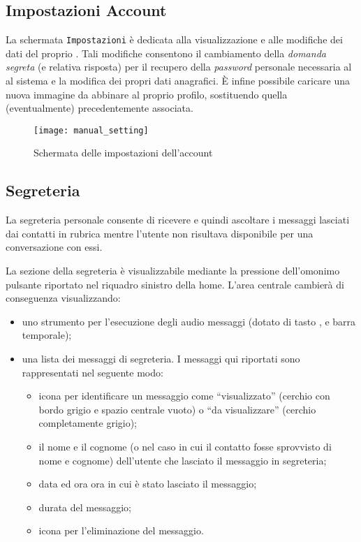\subsection{Impostazioni Account}
La schermata \texttt{Impostazioni} è dedicata alla visualizzazione e alle modifiche dei dati del proprio . Tali modifiche consentono il cambiamento della \textit{domanda segreta} (e relativa risposta) per il recupero della \textit{password} personale necessaria al \underline{} al sistema e la modifica dei propri dati anagrafici.
È infine possibile caricare una nuova immagine da abbinare al proprio profilo, sostituendo quella (eventualmente) precedentemente associata.


\begin{figure}[H]
  \texttt{[image: manual\_setting]}
\caption{Schermata delle impostazioni dell'account}\label{fig:setting}
\end{figure}

 
\subsection{Segreteria}
La segreteria personale consente di ricevere e quindi ascoltare i messaggi lasciati dai contatti in rubrica mentre l'utente non risultava disponibile per una conversazione con essi.

La sezione della segreteria è visualizzabile mediante la pressione dell'omonimo pulsante riportato nel riquadro sinistro della home. L'area centrale cambierà di conseguenza visualizzando:
	\begin{itemize}
		\item uno strumento per l'esecuzione degli audio messaggi (dotato di tasto ,  e barra temporale);
		\item una lista dei messaggi di segreteria. I messaggi qui riportati sono rappresentati nel seguente modo:
			\begin{itemize}
				\item icona per identificare un messaggio come ``visualizzato'' (cerchio con bordo grigio e spazio centrale vuoto) o ``da visualizzare'' (cerchio completamente grigio);
				\item il nome e il cognome (o  nel caso in cui il contatto fosse sprovvisto di nome e cognome) dell'utente che lasciato il messaggio in segreteria;
				\item data ed ora ora in cui è stato lasciato il messaggio;
				\item durata del messaggio;
				\item icona per l'eliminazione del messaggio.
			\end{itemize}
	\end{itemize}	 

